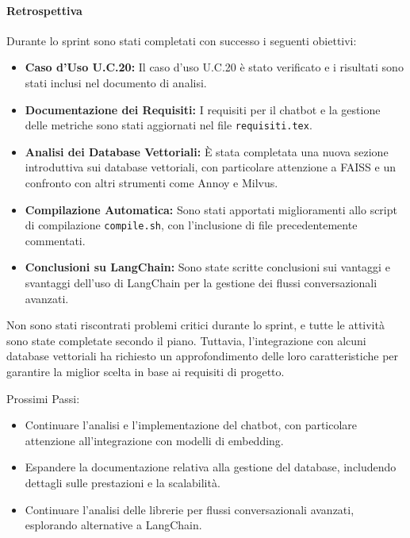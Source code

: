 \documentclass{article}
\begin{document}
                \paragraph{Retrospettiva}
                Durante lo sprint sono stati completati con successo i seguenti obiettivi:
                \begin{itemize}
                    \item \textbf{Caso d'Uso U.C.20:} Il caso d'uso U.C.20 è stato verificato e i risultati sono stati inclusi nel documento di analisi.
                    \item \textbf{Documentazione dei Requisiti:} I requisiti per il chatbot e la gestione delle metriche sono stati aggiornati nel file \texttt{requisiti.tex}.
                    \item \textbf{Analisi dei Database Vettoriali:} È stata completata una nuova sezione introduttiva sui database vettoriali, con particolare attenzione a FAISS e un confronto con altri strumenti come Annoy e Milvus.
                    \item \textbf{Compilazione Automatica:} Sono stati apportati miglioramenti allo script di compilazione \texttt{compile.sh}, con l'inclusione di file precedentemente commentati.
                    \item \textbf{Conclusioni su LangChain:} Sono state scritte conclusioni sui vantaggi e svantaggi dell'uso di LangChain per la gestione dei flussi conversazionali avanzati.
                \end{itemize}
                
                Non sono stati riscontrati problemi critici durante lo sprint, e tutte le attività sono state completate secondo il piano. Tuttavia, l'integrazione con alcuni database vettoriali ha richiesto un approfondimento delle loro caratteristiche per garantire la miglior scelta in base ai requisiti di progetto.
                
                Prossimi Passi:
                \begin{itemize}
                    \item Continuare l'analisi e l'implementazione del chatbot, con particolare attenzione all'integrazione con modelli di embedding.
                    \item Espandere la documentazione relativa alla gestione del database, includendo dettagli sulle prestazioni e la scalabilità.
                    \item Continuare l'analisi delle librerie per flussi conversazionali avanzati, esplorando alternative a LangChain.
                \end{itemize}
\end{document}
